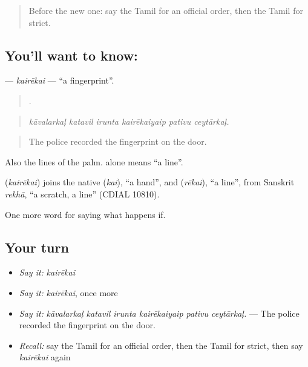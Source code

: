 \label{lesson:TA-C543-kairekai}



\begin{quote}
Before the new one: say the Tamil for an official order, then the Tamil for strict.
\end{quote}

\subsection*{You'll want to know: }
\textbf{} — \emph{kairēkai} — \textquotedblleft{}a fingerprint\textquotedblright{}.

\begin{quote}
     .
\end{quote}

\begin{quote}
\emph{kāvalarkaḷ katavil irunta kairēkaiyaip pativu ceytārkaḷ.}
\end{quote}

\begin{quote}
The police recorded the fingerprint on the door.
\end{quote}

Also the lines of the palm.  alone means \textquotedblleft{}a line\textquotedblright{}.

\begin{cousinweb}
\textbf{} (\emph{kairēkai}) joins the native  (\emph{kai}), \textquotedblleft{}a hand\textquotedblright{}, and  (\emph{rēkai}), \textquotedblleft{}a line\textquotedblright{}, from Sanskrit \emph{rekhā}, \textquotedblleft{}a scratch, a line\textquotedblright{} (CDIAL 10810).
\end{cousinweb}

\begin{grammarlens}[title={What you've built}]
One more word for saying what happens if.
\end{grammarlens}

\subsection*{Your turn}
\begin{itemize}
\raggedright
  \item \emph{Say it:} \emph{kairēkai}
  \item \emph{Say it:} \emph{kairēkai}, once more
  \item \emph{Say it:} \emph{kāvalarkaḷ katavil irunta kairēkaiyaip pativu ceytārkaḷ.} — The police recorded the fingerprint on the door.
  \item \emph{Recall:} say the Tamil for an official order, then the Tamil for strict, then say \emph{kairēkai} again
\end{itemize}

